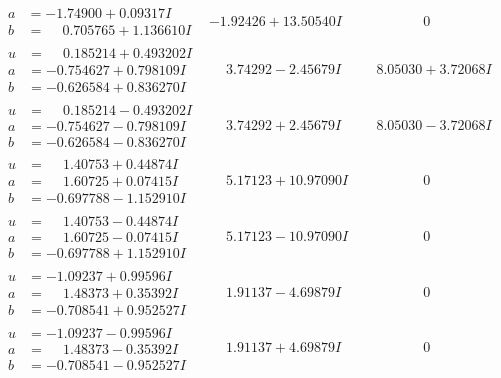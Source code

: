 \documentclass[1p]{elsarticle_modified}
\theoremstyle{definition}
\begin{document}
$$\begin{array}{c|c|c}
\begin{aligned}
a &= -1.74900 + 0.09317 I \\
b &= \phantom{-}0.705765 + 1.136610 I\end{aligned}
 & -1.92426 + 13.50540 I & \phantom{-0.000000 } 0 \\ \hline\begin{aligned}
u &= \phantom{-}0.185214 + 0.493202 I \\
a &= -0.754627 + 0.798109 I \\
b &= -0.626584 + 0.836270 I\end{aligned}
 & \phantom{-}3.74292 - 2.45679 I & \phantom{-}8.05030 + 3.72068 I \\ \hline\begin{aligned}
u &= \phantom{-}0.185214 - 0.493202 I \\
a &= -0.754627 - 0.798109 I \\
b &= -0.626584 - 0.836270 I\end{aligned}
 & \phantom{-}3.74292 + 2.45679 I & \phantom{-}8.05030 - 3.72068 I \\ \hline\begin{aligned}
u &= \phantom{-}1.40753 + 0.44874 I \\
a &= \phantom{-}1.60725 + 0.07415 I \\
b &= -0.697788 - 1.152910 I\end{aligned}
 & \phantom{-}5.17123 + 10.97090 I & \phantom{-0.000000 } 0 \\ \hline\begin{aligned}
u &= \phantom{-}1.40753 - 0.44874 I \\
a &= \phantom{-}1.60725 - 0.07415 I \\
b &= -0.697788 + 1.152910 I\end{aligned}
 & \phantom{-}5.17123 - 10.97090 I & \phantom{-0.000000 } 0 \\ \hline\begin{aligned}
u &= -1.09237 + 0.99596 I \\
a &= \phantom{-}1.48373 + 0.35392 I \\
b &= -0.708541 + 0.952527 I\end{aligned}
 & \phantom{-}1.91137 - 4.69879 I & \phantom{-0.000000 } 0 \\ \hline\begin{aligned}
u &= -1.09237 - 0.99596 I \\
a &= \phantom{-}1.48373 - 0.35392 I \\
b &= -0.708541 - 0.952527 I\end{aligned}
 & \phantom{-}1.91137 + 4.69879 I & \phantom{-0.000000 } 0 \\ \hline\begin{aligned}

\end{aligned}
\end{array}$$
\end{document}
